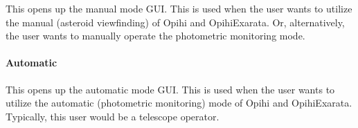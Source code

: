 \documentclass[letterpaper,11pt,english]{sphinxmanual}
\begin{document}
\begin{savenotes}\begin{fulllineitems}
\label{\detokenize{user/command_line:cmdoption-arg-manual}}
\pysigstartsignatures
{}
\pysigstopsignatures
\end{fulllineitems}\end{savenotes}


\sphinxAtStartPar
This opens up the manual mode GUI. This is used when the user wants to
utilize the manual (asteroid view\sphinxhyphen{}finding) of Opihi and OpihiExarata. Or,
alternatively, the user wants to manually operate the photometric monitoring
mode.


\paragraph{Automatic}
\label{\detokenize{user/command_line:automatic}}\label{\detokenize{user/command_line:user-command-line-available-actions-automatic}}

\begin{savenotes}\begin{fulllineitems}
\label{\detokenize{user/command_line:cmdoption-arg-automatic}}
\pysigstartsignatures
{}
\pysigstopsignatures
\end{fulllineitems}\end{savenotes}


\sphinxAtStartPar
This opens up the automatic mode GUI. This is used when the user wants to
utilize the automatic (photometric monitoring) mode of Opihi and OpihiExarata.
Typically, this user would be a telescope operator.
\end{document}
